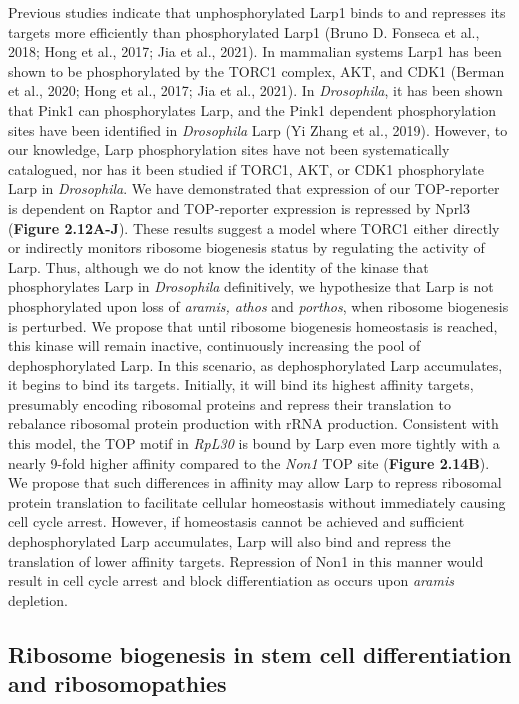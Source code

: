 \documentclass[12pt,oneside]{reedthesis}
\begin{document}
Previous studies indicate that unphosphorylated Larp1 binds to and represses its targets more efficiently than phosphorylated Larp1 (Bruno D. Fonseca et al., 2018; Hong et al., 2017; Jia et al., 2021). In mammalian systems Larp1 has been shown to be phosphorylated by the TORC1 complex, AKT, and CDK1 (Berman et al., 2020; Hong et al., 2017; Jia et al., 2021). In \emph{Drosophila}, it has been shown that Pink1 can phosphorylates Larp, and the Pink1 dependent phosphorylation sites have been identified in \emph{Drosophila} Larp (Yi Zhang et al., 2019). However, to our knowledge, Larp phosphorylation sites have not been systematically catalogued, nor has it been studied if TORC1, AKT, or CDK1 phosphorylate Larp in \emph{Drosophila}. We have demonstrated that expression of our TOP-reporter is dependent on Raptor and TOP-reporter expression is repressed by Nprl3 (\textbf{Figure 2.12A-J}). These results suggest a model where TORC1 either directly or indirectly monitors ribosome biogenesis status by regulating the activity of Larp. Thus, although we do not know the identity of the kinase that phosphorylates Larp in \emph{Drosophila} definitively, we hypothesize that Larp is not phosphorylated upon loss of \emph{aramis, athos} and \emph{porthos}, when ribosome biogenesis is perturbed. We propose that until ribosome biogenesis homeostasis is reached, this kinase will remain inactive, continuously increasing the pool of dephosphorylated Larp. In this scenario, as dephosphorylated Larp accumulates, it begins to bind its targets. Initially, it will bind its highest affinity targets, presumably encoding ribosomal proteins and repress their translation to rebalance ribosomal protein production with rRNA production. Consistent with this model, the TOP motif in \emph{RpL30} is bound by Larp even more tightly with a nearly 9-fold higher affinity compared to the \emph{Non1} TOP site (\textbf{Figure 2.14B}). We propose that such differences in affinity may allow Larp to repress ribosomal protein translation to facilitate cellular homeostasis without immediately causing cell cycle arrest. However, if homeostasis cannot be achieved and sufficient dephosphorylated Larp accumulates, Larp will also bind and repress the translation of lower affinity targets. Repression of Non1 in this manner would result in cell cycle arrest and block differentiation as occurs upon \emph{aramis} depletion.

\hypertarget{ribosome-biogenesis-in-stem-cell-differentiation-and-ribosomopathies}{%
\subsection{Ribosome biogenesis in stem cell differentiation and ribosomopathies}\label{ribosome-biogenesis-in-stem-cell-differentiation-and-ribosomopathies}}
\end{document}
